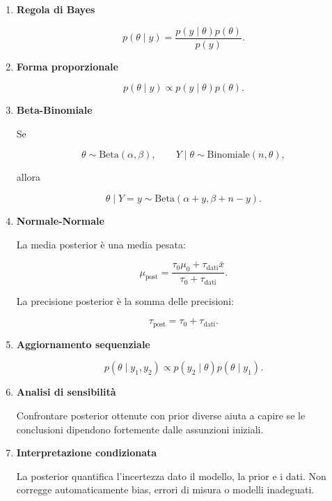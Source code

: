 \documentclass[
  italian,
  letterpaper,
  a4paper,
  11pt,
  open=any]{scrbook}
\theoremstyle{plain}
\theoremstyle{definition}
\theoremstyle{definition}
\theoremstyle{remark}
\begin{document}
\begin{tcolorbox}[enhanced jigsaw, arc=.35mm, bottomrule=.15mm, bottomtitle=1mm, breakable, colback=white, colbacktitle=quarto-callout-important-color!10!white, colframe=quarto-callout-important-color-frame, coltitle=black, left=2mm, leftrule=.75mm, opacityback=0, opacitybacktitle=0.6, rightrule=.15mm, title=\textcolor{quarto-callout-important-color}{\faExclamation}\hspace{0.5em}{Importante}, titlerule=0mm, toprule=.15mm, toptitle=1mm]

\begin{enumerate}
\def\labelenumi{\arabic{enumi}.}
\item
  \textbf{Regola di Bayes}

  \[
  p(\theta \mid y) =
  \frac{p(y \mid \theta)p(\theta)}{p(y)}.
  \]
\item
  \textbf{Forma proporzionale}

  \[
  p(\theta \mid y) \propto p(y \mid \theta)p(\theta).
  \]
\item
  \textbf{Beta-Binomiale}

  Se

  \[
  \theta \sim \text{Beta}(\alpha,\beta),
  \qquad
  Y \mid \theta \sim \text{Binomiale}(n,\theta),
  \]

  allora

  \[
  \theta \mid Y=y \sim
  \text{Beta}(\alpha+y,\beta+n-y).
  \]
\item
  \textbf{Normale-Normale}

  La media posterior è una media pesata:

  \[
  \mu_{\text{post}} =
  \frac{\tau_0\mu_0 + \tau_{\text{dati}}\bar{x}}
  {\tau_0 + \tau_{\text{dati}}}.
  \]

  La precisione posterior è la somma delle precisioni:

  \[
  \tau_{\text{post}} = \tau_0 + \tau_{\text{dati}}.
  \]
\item
  \textbf{Aggiornamento sequenziale}

  \[
  p(\theta \mid y_1,y_2)
  \propto
  p(y_2 \mid \theta)p(\theta \mid y_1).
  \]
\item
  \textbf{Analisi di sensibilità}

  Confrontare posterior ottenute con prior diverse aiuta a capire se le
  conclusioni dipendono fortemente dalle assunzioni iniziali.
\item
  \textbf{Interpretazione condizionata}

  La posterior quantifica l'incertezza dato il modello, la prior e i
  dati. Non corregge automaticamente bias, errori di misura o modelli
  inadeguati.
\end{enumerate}

\end{tcolorbox}
\end{document}

